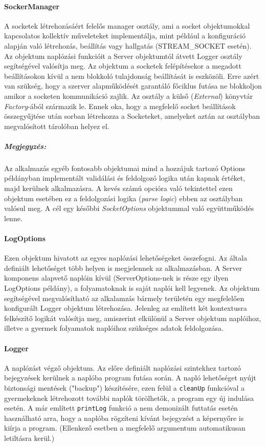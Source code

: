 \documentclass[12pt]{report}
\begin{document}
  \paragraph{SockerManager}
  A socketek létrehozásáért felelős manager osztály, ami a socket objektumokkal kapcsolatos kollektív műveleteket implementálja, mint például a konfiguráció alapján való létrehozás, beállítás vagy hallgatás (STREAM\_SOCKET esetén). Az objektum naplózási funkcióit a Server objektumtól átvett Logger osztály segítségével valósítja meg. Az objektum a socketek felépítésekor a megadott beállításokon kívül a nem blokkoló tulajdonság beállítását is eszközöli. Erre azért van szükség, hogy a szerver alapműködését garantáló főciklus futása ne blokkoljon amikor a socketen kommunikáció zajlik.
  Az osztály a külső (\textit{External}) könyvtár \textit{Factory}-ából származik le. Ennek oka, hogy a megfelelő socket beállítások összegyűjtése után sorban létrehozza a Socketeket, amelyeket aztán az osztályban megvalósított tárolóban helyez el.
  \subparagraph{Megjegyzés:} Az alkalmazás egyéb fontosabb objektumai mind a hozzájuk tartozó Options példányban implementált validálási és feldolgozó logika után kapnak értéket, majd kerülnek alkalmazásra. A kevés számú opcióra való tekintettel ezen objektum esetében ez a feldolgozási logika (\textit{parse logic}) ebben az osztályban valósul meg. A cél egy későbbi \textit{SocketOptions} objektummal való együttműködés lenne. 
  \paragraph{LogOptions}
  Ezen objektum hivatott az egyes naplózási lehetőségeket összefogni. Az általa definiált lehetőséget több helyen is megjelennek az alkalmazásban. A Server komponens alapvető naplóin kívül (ServerOptions-nek is része egy ilyen LogOptions példány), a folyamatoknak is saját naplói kell legyenek. Az objektum segítségével megvalósítható az alkalamzás bármely területén egy megfelelően konfigurált Logger objektum létrehozása. Jelenleg az említett két kontextusra felkészítő logikát valósítja meg, amiszerint elkülönül a Server objektum naplóihoz, illetve a gyermek folyamatok naplóihoz szükséges adatok feldolgozása.
  \paragraph{Logger}
  A naplózást végző objektum. Az előre definiált naplózási szintekhez tartozó bejegyzések kerülnek a naplóba program futása során. A napló lehetőséget nyújt biztonsági mentések ("backup") készítésére, ezen felül a \verb|cleanUp| funkcióval a gyermekeknek létrehozott további naplók törölhetők, a program egy új indulása esetén. A már említett \verb|printLog| funkció a nem demonizált futtatás esetén használható arra, hogy a naplóba rögzíteni kívánt bejegyzést a képernyőre is kiírja a program. (Ellenkező esetben a megfelelő argumentum automatikusan letiltásra kerül.)
\end{document}
